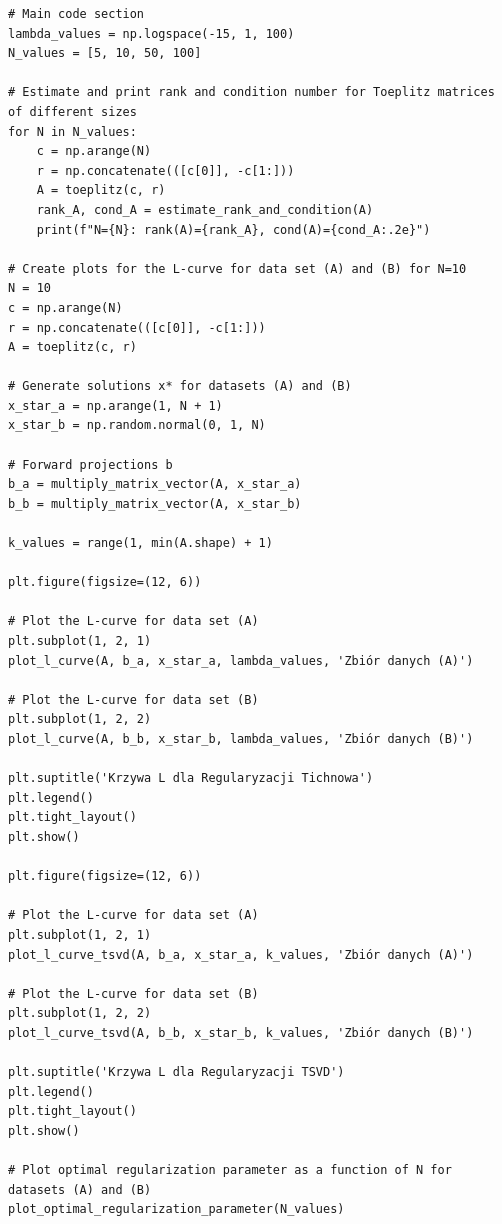 \documentclass{article}
\begin{document}
\begin{lstlisting}
# Main code section
lambda_values = np.logspace(-15, 1, 100)
N_values = [5, 10, 50, 100]

# Estimate and print rank and condition number for Toeplitz matrices of different sizes
for N in N_values:
    c = np.arange(N)
    r = np.concatenate(([c[0]], -c[1:]))
    A = toeplitz(c, r)
    rank_A, cond_A = estimate_rank_and_condition(A)
    print(f"N={N}: rank(A)={rank_A}, cond(A)={cond_A:.2e}")

# Create plots for the L-curve for data set (A) and (B) for N=10
N = 10
c = np.arange(N)
r = np.concatenate(([c[0]], -c[1:]))
A = toeplitz(c, r)

# Generate solutions x* for datasets (A) and (B)
x_star_a = np.arange(1, N + 1)
x_star_b = np.random.normal(0, 1, N)

# Forward projections b
b_a = multiply_matrix_vector(A, x_star_a)
b_b = multiply_matrix_vector(A, x_star_b)

k_values = range(1, min(A.shape) + 1)

plt.figure(figsize=(12, 6))

# Plot the L-curve for data set (A)
plt.subplot(1, 2, 1)
plot_l_curve(A, b_a, x_star_a, lambda_values, 'Zbiór danych (A)')

# Plot the L-curve for data set (B)
plt.subplot(1, 2, 2)
plot_l_curve(A, b_b, x_star_b, lambda_values, 'Zbiór danych (B)')

plt.suptitle('Krzywa L dla Regularyzacji Tichnowa')
plt.legend()
plt.tight_layout()
plt.show()

plt.figure(figsize=(12, 6))

# Plot the L-curve for data set (A)
plt.subplot(1, 2, 1)
plot_l_curve_tsvd(A, b_a, x_star_a, k_values, 'Zbiór danych (A)')

# Plot the L-curve for data set (B)
plt.subplot(1, 2, 2)
plot_l_curve_tsvd(A, b_b, x_star_b, k_values, 'Zbiór danych (B)')

plt.suptitle('Krzywa L dla Regularyzacji TSVD')
plt.legend()
plt.tight_layout()
plt.show()

# Plot optimal regularization parameter as a function of N for datasets (A) and (B)
plot_optimal_regularization_parameter(N_values)

\end{lstlisting}
\end{document}
